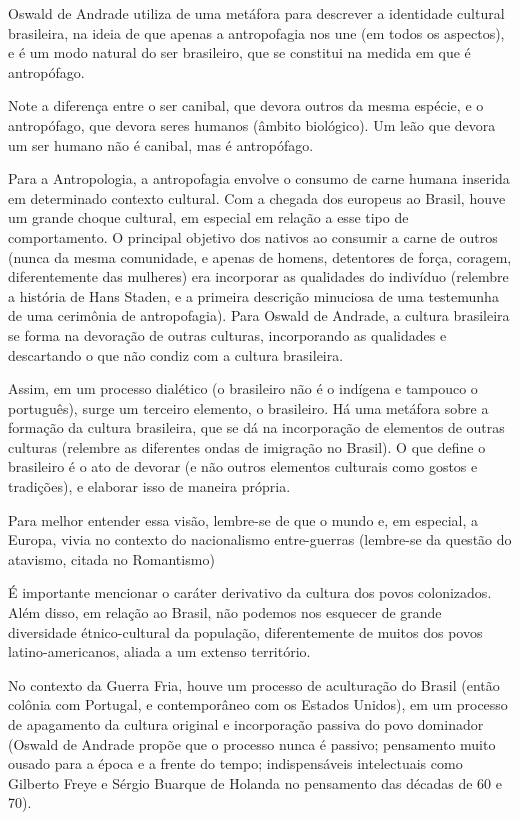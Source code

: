Oswald de Andrade utiliza de uma metáfora para descrever a identidade cultural brasileira, na ideia de que apenas a antropofagia nos une (em todos os aspectos), e é um modo natural do ser brasileiro, que se constitui na medida em que é antropófago.

Note a diferença entre o ser canibal, que devora outros da mesma espécie, e o antropófago, que devora seres humanos (âmbito biológico). Um leão que devora um ser humano não é canibal, mas é antropófago.

Para a Antropologia, a antropofagia envolve o consumo de carne humana inserida em determinado contexto cultural. Com a chegada dos europeus ao Brasil, houve um grande choque cultural, em especial em relação a esse tipo de comportamento. O principal objetivo dos nativos ao consumir a carne de outros (nunca da mesma comunidade, e apenas de homens, detentores de força, coragem, diferentemente das mulheres) era incorporar as qualidades do indivíduo (relembre a história de Hans Staden, e a primeira descrição minuciosa de uma testemunha de uma cerimônia de antropofagia). Para Oswald de Andrade, a cultura brasileira se forma na devoração de outras culturas, incorporando as qualidades e descartando o que não condiz com a cultura brasileira.

Assim, em um processo dialético (o brasileiro não é o indígena e tampouco o português), surge um terceiro elemento, o brasileiro. Há uma metáfora sobre a formação da cultura brasileira, que se dá na incorporação de elementos de outras culturas (relembre as diferentes ondas de imigração no Brasil). O que define o brasileiro é o ato de devorar (e não outros elementos culturais como gostos e tradições), e elaborar isso de maneira própria.

Para melhor entender essa visão, lembre-se de que o mundo e, em especial, a Europa, vivia no contexto do nacionalismo entre-guerras (lembre-se da questão do atavismo, citada no Romantismo)

É importante mencionar o caráter derivativo da cultura dos povos colonizados. Além disso, em relação ao Brasil, não podemos nos esquecer de grande diversidade étnico-cultural da população, diferentemente de muitos dos povos latino-americanos, aliada a um extenso território.

No contexto da Guerra Fria, houve um processo de aculturação do Brasil (então colônia com Portugal, e contemporâneo com os Estados Unidos), em um processo de apagamento da cultura original e incorporação passiva do povo dominador (Oswald de Andrade propõe que o processo nunca é passivo; pensamento muito ousado para a época e a frente do tempo; indispensáveis intelectuais como Gilberto Freye e Sérgio Buarque de Holanda no pensamento das décadas de 60 e 70).

